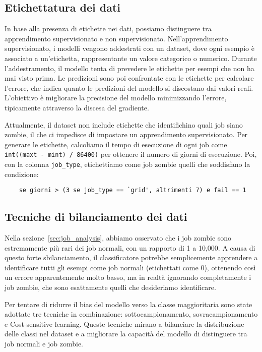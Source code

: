 \subsection{Etichettatura dei dati}

In base alla presenza di etichette nei dati, possiamo distinguere tra
apprendimento supervisionato e non supervisionato. Nell'apprendimento
supervisionato, i modelli vengono addestrati con un dataset, dove ogni esempio
è associato a un'etichetta, rappresentante un valore categorico o numerico.
Durante l'addestramento, il modello tenta di prevedere le etichette per esempi
che non ha mai visto prima. Le predizioni sono poi confrontate con le
etichette per calcolare l'errore, che indica quanto le predizioni del modello
si discostano dai valori reali. L'obiettivo è migliorare la precisione del
modello minimizzando l'errore, tipicamente attraverso la discesa del
gradiente.

Attualmente, il dataset non include etichette che identifichino quali job
siano zombie, il che ci impedisce di impostare un apprendimento
supervisionato. Per generare le etichette, calcoliamo il tempo di esecuzione
di ogni job come \verb|int((maxt - mint) / 86400)| per ottenere il numero
di giorni di esecuzione. Poi, con la colonna \texttt{job\_type}, etichettiamo
come job zombie quelli che soddisfano la condizione:

\begin{verbatim}
    se giorni > (3 se job_type == `grid', altrimenti 7) e fail == 1 
\end{verbatim}

\subsection{Tecniche di bilanciamento dei dati}

Nella sezione~\ref{sec:job_analysis}, abbiamo osservato che i job zombie sono
estremamente più rari dei job normali, con un rapporto di 1 a 10,000. A causa
di questo forte sbilanciamento, il classificatore potrebbe semplicemente
apprendere a identificare tutti gli esempi come job normali (etichettati come
0), ottenendo così un errore apparentemente molto basso, ma in realtà
ignorando completamente i job zombie, che sono esattamente quelli che
desideriamo identificare. 

Per tentare di ridurre il bias del modello verso la classe maggioritaria sono
state adottate tre tecniche in combinazione: sottocampionamento,
sovracampionamento e Cost-sensitive learning. Queste tecniche mirano a
bilanciare la distribuzione delle classi nel dataset e a migliorare la
capacità del modello di distinguere tra job normali e job zombie. 

